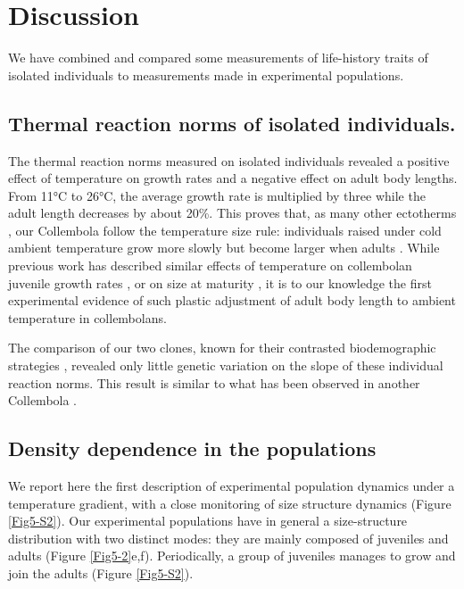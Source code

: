 \section{Discussion}

We have combined and compared some measurements of life-history traits of
isolated individuals to measurements made in experimental populations.

\subsection{Thermal reaction norms of isolated individuals.}

The thermal reaction norms measured on isolated individuals revealed a positive
effect of temperature on growth rates and a negative effect on adult body
lengths. From 11°C to 26°C, the average growth rate is multiplied by three while
the adult length decreases by about 20\%. This proves that, as many other
ectotherms \autocite{atkinson1994a,angilletta2009a}, our
Collembola follow the temperature size rule: individuals raised under cold ambient temperature grow
more slowly but become larger when adults \autocite{angilletta2003a}.
While previous work has described similar effects of temperature on collembolan
juvenile growth rates
\autocite{birkemoe2000a,driessen2007a,ellers2008a,ellers2011a}, or on size at
maturity \autocite{stam1996a}, it is to our knowledge the first experimental
evidence of such plastic adjustment of adult body length to ambient temperature in collembolans.

The comparison of our two clones, known for their contrasted biodemographic
strategies \autocite{tully2006a}, revealed only little genetic
variation on the slope of these individual reaction norms. This result is similar to what has
been observed in another Collembola \autocite{driessen2007a}.

\subsection{Density dependence in the populations}

We report here the first description of experimental population dynamics under a
temperature gradient, with a close monitoring of size structure dynamics
(Figure \ref{Fig5-S2}). Our experimental populations have in general a
size-structure distribution with two distinct modes: they are mainly composed of
juveniles and adults (Figure \ref{Fig5-2}e,f). Periodically, a group of
juveniles manages to grow and join the adults (Figure \ref{Fig5-S2}).

